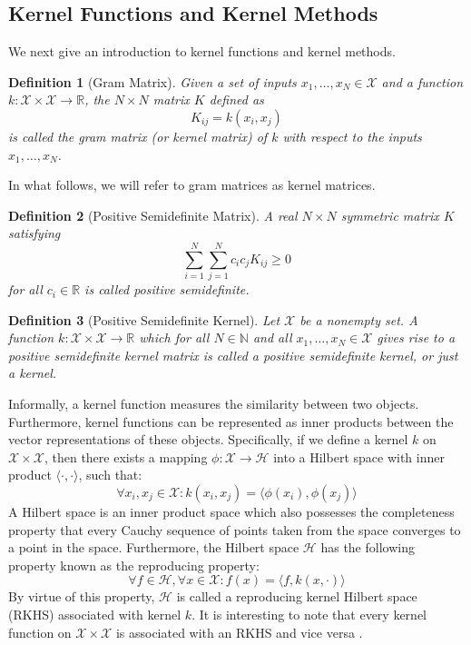 \documentclass[twoside,11pt]{article}
\newtheorem{definition}{Definition}
\begin{document}
\subsection{Kernel Functions and Kernel Methods}
We next give an introduction to kernel functions and kernel methods.
\begin{definition}[Gram Matrix]
  Given a set of inputs $x_1,\ldots,x_N \in \mathcal{X}$ and a function $k : \mathcal{X} \times \mathcal{X} \rightarrow \mathbb{R}$, the $N \times N$ matrix $K$ defined as
  \begin{equation}
    K_{ij} = k(x_i, x_j)
  \end{equation}
  is called the gram matrix (or kernel matrix) of $k$ with respect to the inputs $x_1,\ldots,x_N$.
\end{definition} 
In what follows, we will refer to gram matrices as kernel matrices.
\begin{definition}[Positive Semidefinite Matrix]
  A real $N \times N$ symmetric matrix $K$ satisfying
  \begin{equation}
    \sum_{i=1}^N \sum_{j=1}^N c_i c_j K_{ij} \geq 0
  \end{equation}
  for all $c_i \in \mathbb{R}$ is called positive semidefinite.
\end{definition}
\begin{definition}[Positive Semidefinite Kernel]
  Let $\mathcal{X}$ be a nonempty set.
  A function $k : \mathcal{X} \times \mathcal{X} \rightarrow \mathbb{R}$ which for all $N \in \mathbb{N}$ and all $x_1,\ldots,x_N \in \mathcal{X}$ gives rise to a positive semidefinite kernel matrix is called a positive semidefinite kernel, or just a kernel.
\end{definition} 
Informally, a kernel function 
measures the similarity between two objects. 
Furthermore, kernel functions can be represented as inner products between the vector representations of these objects. 
Specifically, if we define a kernel $k$ on $\mathcal{X} \times \mathcal{X}$, then there exists a mapping $\phi : \mathcal{X} \rightarrow \mathcal{H}$ into a Hilbert space with inner product $\langle \cdot, \cdot \rangle$, such that:
\begin{equation}
  \forall x_i,x_j \in \mathcal{X} : k(x_i, x_j) = \langle \phi(x_i), \phi(x_j) \rangle
\end{equation}
A Hilbert space is an inner product space which also possesses the completeness property that every Cauchy sequence of points taken from the space converges to a point in the space.
Furthermore, the Hilbert space $\mathcal{H}$ has the following property known as the reproducing property:
\begin{equation}
  \forall f \in \mathcal{H}, \forall x \in \mathcal{X} : f(x) = \langle f, k(x,\cdot) \rangle
\end{equation}
By virtue of this property, $\mathcal{H}$ is called a reproducing kernel Hilbert space (RKHS) associated with kernel $k$.
It is interesting to note that every kernel function on $\mathcal{X} \times \mathcal{X}$ is associated with an RKHS and vice versa .
\end{document}
